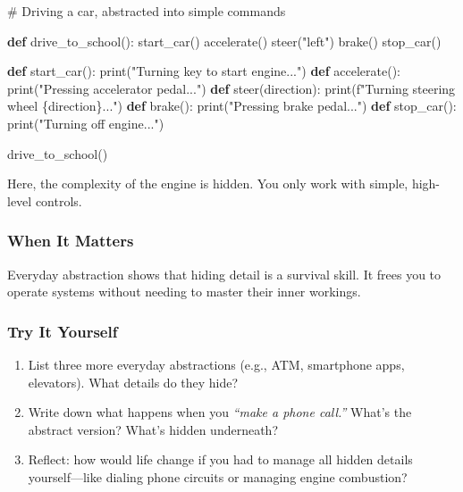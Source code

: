 \documentclass[
  letterpaper,
  DIV=11,
  numbers=noendperiod]{scrreprt}
\newenvironment{Shaded}{\begin{snugshade}}{\end{snugshade}}
\newcommand{\BuiltInTok}[1]{\textcolor[rgb]{0.00,0.23,0.31}{#1}}
\newcommand{\CommentTok}[1]{\textcolor[rgb]{0.37,0.37,0.37}{#1}}
\newcommand{\KeywordTok}[1]{\textcolor[rgb]{0.00,0.23,0.31}{\textbf{#1}}}
\newcommand{\NormalTok}[1]{\textcolor[rgb]{0.00,0.23,0.31}{#1}}
\newcommand{\SpecialCharTok}[1]{\textcolor[rgb]{0.37,0.37,0.37}{#1}}
\newcommand{\SpecialStringTok}[1]{\textcolor[rgb]{0.13,0.47,0.30}{#1}}
\newcommand{\StringTok}[1]{\textcolor[rgb]{0.13,0.47,0.30}{#1}}
\providecommand{\tightlist}{%
  \setlength{\itemsep}{0pt}\setlength{\parskip}{0pt}}
\begin{document}
\begin{Shaded}
\begin{Highlighting}[]
\CommentTok{\# Driving a car, abstracted into simple commands}

\KeywordTok{def}\NormalTok{ drive\_to\_school():}
\NormalTok{    start\_car()}
\NormalTok{    accelerate()}
\NormalTok{    steer(}\StringTok{"left"}\NormalTok{)}
\NormalTok{    brake()}
\NormalTok{    stop\_car()}

\KeywordTok{def}\NormalTok{ start\_car(): }\BuiltInTok{print}\NormalTok{(}\StringTok{"Turning key to start engine..."}\NormalTok{)}
\KeywordTok{def}\NormalTok{ accelerate(): }\BuiltInTok{print}\NormalTok{(}\StringTok{"Pressing accelerator pedal..."}\NormalTok{)}
\KeywordTok{def}\NormalTok{ steer(direction): }\BuiltInTok{print}\NormalTok{(}\SpecialStringTok{f"Turning steering wheel }\SpecialCharTok{\{}\NormalTok{direction}\SpecialCharTok{\}}\SpecialStringTok{..."}\NormalTok{)}
\KeywordTok{def}\NormalTok{ brake(): }\BuiltInTok{print}\NormalTok{(}\StringTok{"Pressing brake pedal..."}\NormalTok{)}
\KeywordTok{def}\NormalTok{ stop\_car(): }\BuiltInTok{print}\NormalTok{(}\StringTok{"Turning off engine..."}\NormalTok{)}

\NormalTok{drive\_to\_school()}
\end{Highlighting}
\end{Shaded}

Here, the complexity of the engine is hidden. You only work with simple,
high-level controls.

\subsubsection{When It Matters}\label{when-it-matters-40}

Everyday abstraction shows that hiding detail is a survival skill. It
frees you to operate systems without needing to master their inner
workings.

\subsubsection{Try It Yourself}\label{try-it-yourself-42}

\begin{enumerate}
\def\labelenumi{\arabic{enumi}.}
\tightlist
\item
  List three more everyday abstractions (e.g., ATM, smartphone apps,
  elevators). What details do they hide?
\item
  Write down what happens when you \emph{``make a phone call.''} What's
  the abstract version? What's hidden underneath?
\item
  Reflect: how would life change if you had to manage all hidden details
  yourself---like dialing phone circuits or managing engine combustion?
\end{enumerate}
\end{document}
